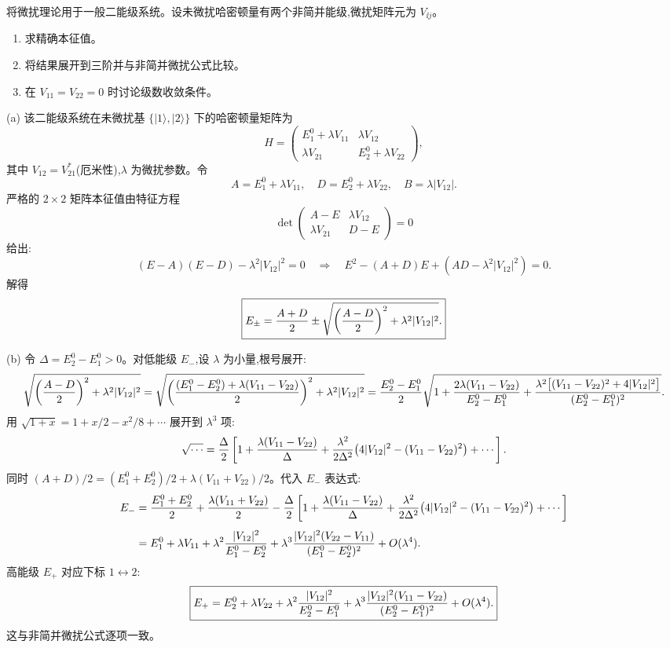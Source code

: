 \begin{question}
将微扰理论用于一般二能级系统。设未微扰哈密顿量有两个非简并能级,微扰矩阵元为 $V_{\ii j}$。
\begin{enumerate}
\item 求精确本征值。
\item 将结果展开到三阶并与非简并微扰公式比较。
\item 在 $V_{11}=V_{22}=0$ 时讨论级数收敛条件。
\end{enumerate}
\end{question}
\begin{solution}
(a) 该二能级系统在未微扰基 $\{|1\rangle,|2\rangle\}$ 下的哈密顿量矩阵为
\[
H=\begin{pmatrix}
E_1^0+\lambda V_{11} & \lambda V_{12}\\[2pt]
\lambda V_{21} & E_2^0+\lambda V_{22}
\end{pmatrix},
\]
其中 $V_{12}=V_{21}^*$(厄米性),$\lambda$ 为微扰参数。令
\[
A=E_1^0+\lambda V_{11},\quad D=E_2^0+\lambda V_{22},\quad
B=\lambda|V_{12}|.
\]
严格的 $2\times2$ 矩阵本征值由特征方程
\[
\det\begin{pmatrix}A-E & \lambda V_{12}\\ \lambda V_{21} & D-E\end{pmatrix}=0
\]
给出:
\[
(E-A)(E-D)-\lambda^2|V_{12}|^2=0
\quad\Longrightarrow\quad
E^2-(A+D)E+(AD-\lambda^2|V_{12}|^2)=0.
\]
解得
\[
\boxed{E_\pm={A+D\over2}\pm\sqrt{\left({A-D\over2}\right)^2+\lambda^2|V_{12}|^2}.}
\]

(b) 令 $\Delta=E_2^0-E_1^0>0$。对低能级 $E_-$,设 $\lambda$ 为小量,根号展开:
\[
\sqrt{\left({A-D\over2}\right)^2+\lambda^2|V_{12}|^2}
=\sqrt{\left({(E_1^0-E_2^0)+\lambda(V_{11}-V_{22})\over2}\right)^2+\lambda^2|V_{12}|^2}
={E_2^0-E_1^0\over2}\sqrt{1+{2\lambda(V_{11}-V_{22})\over E_2^0-E_1^0}
+{\lambda^2\bigl[(V_{11}-V_{22})^2+4|V_{12}|^2\bigr]\over (E_2^0-E_1^0)^2}}.
\]
用 $\sqrt{1+x}=1+x/2-x^2/8+\cdots$ 展开到 $\lambda^3$ 项:
\[
\sqrt{\cdots}={\Delta\over2}\left[1+
{\lambda(V_{11}-V_{22})\over\Delta}+
{\lambda^2\over2\Delta^2}\bigl(4|V_{12}|^2-(V_{11}-V_{22})^2\bigr)+\cdots\right].
\]
同时 $(A+D)/2=(E_1^0+E_2^0)/2+\lambda(V_{11}+V_{22})/2$。代入 $E_-$ 表达式:
\[
\begin{aligned}
E_-&={E_1^0+E_2^0\over2}+{\lambda(V_{11}+V_{22})\over2}
-{\Delta\over2}\left[1+{\lambda(V_{11}-V_{22})\over\Delta}
+{\lambda^2\over2\Delta^2}\bigl(4|V_{12}|^2-(V_{11}-V_{22})^2\bigr)+\cdots\right] \\[4pt]
&=E_1^0+\lambda V_{11}
+\lambda^2{|V_{12}|^2\over E_1^0-E_2^0}
+\lambda^3{|V_{12}|^2(V_{22}-V_{11})\over (E_1^0-E_2^0)^2}+O(\lambda^4).
\end{aligned}
\]
高能级 $E_+$ 对应下标 $1\leftrightarrow2$:
\[
\boxed{E_+=E_2^0+\lambda V_{22}
+\lambda^2{|V_{12}|^2\over E_2^0-E_1^0}
+\lambda^3{|V_{12}|^2(V_{11}-V_{22})\over (E_2^0-E_1^0)^2}+O(\lambda^4).}
\]
这与非简并微扰公式逐项一致。


\end{solution}
